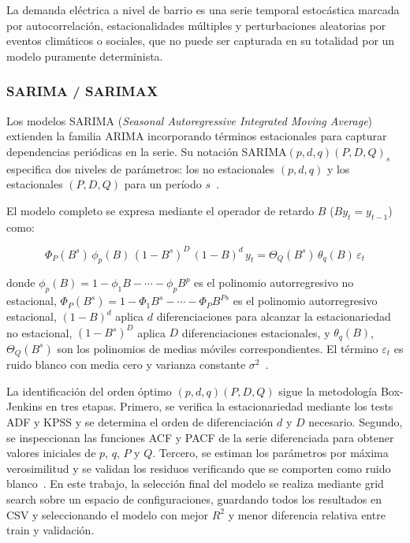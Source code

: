\documentclass[12pt, a4paper]{article}
\begin{document}
La demanda eléctrica a nivel de barrio es una serie temporal estocástica marcada por autocorrelación, estacionalidades múltiples y perturbaciones aleatorias por eventos climáticos o sociales, que no puede ser capturada en su totalidad por un modelo puramente determinista. 

\subsubsection{SARIMA / SARIMAX}

Los modelos SARIMA (\textit{Seasonal Autoregressive Integrated Moving Average}) extienden la familia ARIMA incorporando términos estacionales para capturar  dependencias periódicas en la serie. Su notación SARIMA$(p, d, q)(P, D, Q)_s$ especifica dos niveles de parámetros: los no estacionales $(p, d, q)$ y los estacionales $(P, D, Q)$ para un período $s$~\cite{hyndman2021, boxjenkins2015}.

El modelo completo se expresa mediante el operador de retardo $B$ ($B y_t = y_{t-1}$) como:

\begin{equation}
\Phi_P(B^s)\,\phi_p(B)\,(1-B^s)^D\,(1-B)^d\, y_t = \Theta_Q(B^s)\,\theta_q(B)\,\varepsilon_t
\end{equation}

donde $\phi_p(B) = 1 - \phi_1 B - \cdots - \phi_p B^p$ es el polinomio autorregresivo no estacional, $\Phi_P(B^s) = 1 - \Phi_1 B^s - \cdots - \Phi_P B^{Ps}$ es el polinomio autorregresivo estacional, $(1-B)^d$ aplica $d$ diferenciaciones para alcanzar la estacionariedad no estacional, $(1-B^s)^D$ aplica $D$ diferenciaciones estacionales, y $\theta_q(B)$, $\Theta_Q(B^s)$ son los polinomios de medias móviles correspondientes. El término $\varepsilon_t$ es ruido blanco con media cero y varianza constante $\sigma^2$~\cite{hyndman2021}.

La identificación del orden óptimo $(p, d, q)(P, D, Q)$ sigue la metodología Box-Jenkins en tres etapas. Primero, se verifica la estacionariedad mediante los tests ADF y KPSS y se determina el orden de diferenciación $d$ y $D$ necesario. Segundo, se inspeccionan las funciones ACF y PACF de la serie diferenciada para obtener valores iniciales de $p$, $q$, $P$ y $Q$. Tercero, se estiman los parámetros por máxima verosimilitud y se validan los residuos verificando que se comporten como ruido blanco~\cite{hyndman2021, boxjenkins2015}. En este trabajo, la selección final del modelo se realiza mediante grid search sobre un espacio de configuraciones, guardando todos los resultados en CSV y seleccionando el modelo con mejor $R^2$ y menor diferencia relativa entre train y validación.
\end{document}

